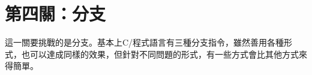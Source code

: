 \chapter{第四關：分支}
這一關要挑戰的是分支。基本上C/\cc{}程式語言有三種分支指令，雖然善用各種形式，也可以達成同樣的效果，但針對不同問題的形式，有一些方式會比其他方式來得簡單。






















